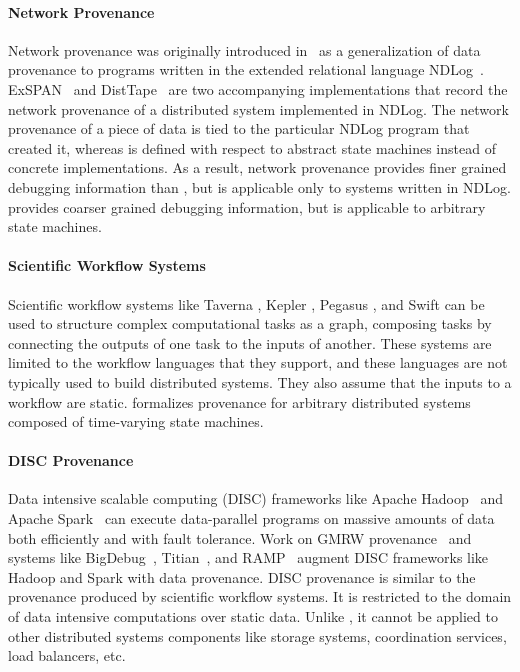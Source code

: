 \paragraph{Network Provenance}
Network provenance was originally introduced in~\cite{zhou2010efficient} as a
generalization of data provenance to programs written in the extended
relational language NDLog~\cite{loo2006design}. ExSPAN~\cite{zhou2010efficient}
and DistTape~\cite{zhou2012distributed} are two accompanying implementations
that record the network provenance of a distributed system implemented in
NDLog.
%
The network provenance of a piece of data is tied to the particular NDLog
program that created it, whereas \watprovenance{} is defined with respect to
abstract state machines instead of concrete implementations. As a result,
network provenance provides finer grained debugging information than
\watprovenance{}, but is applicable only to systems written in NDLog.
\Watprovenance{} provides coarser grained debugging information, but is
applicable to arbitrary state machines.

\paragraph{Scientific Workflow Systems}
Scientific workflow systems like Taverna \cite{wolstencroft2013taverna}, Kepler
\cite{altintas2006provenance}, Pegasus \cite{kim2008provenance}, and Swift
\cite{wozniak2013swift} can be used to structure complex computational tasks as
a graph, composing tasks by connecting the outputs of one task to the inputs of
another. These systems are limited to the workflow languages that they support,
and these languages are not typically used to build distributed systems. They
also assume that the inputs to a workflow are static. \Watprovenance{}
formalizes provenance for arbitrary distributed systems composed of
time-varying state machines.

\paragraph{DISC Provenance}
Data intensive scalable computing (DISC) frameworks like Apache
Hadoop~\cite{shvachko2010hadoop} and Apache Spark~\cite{zaharia2010spark} can
execute data-parallel programs on massive amounts of data both efficiently and
with fault tolerance. Work on GMRW provenance~\cite{ikeda2011provenance} and
systems like BigDebug~\cite{gulzar2016bigdebug},
Titian~\cite{interlandi2015titian}, and RAMP~\cite{park2011ramp} augment DISC
frameworks like Hadoop and Spark with data provenance. DISC provenance is
similar to the provenance produced by scientific workflow systems. It is
restricted to the domain of data intensive computations over static data.
Unlike \watprovenance{}, it cannot be applied to other distributed systems
components like storage systems, coordination services, load balancers, etc.


